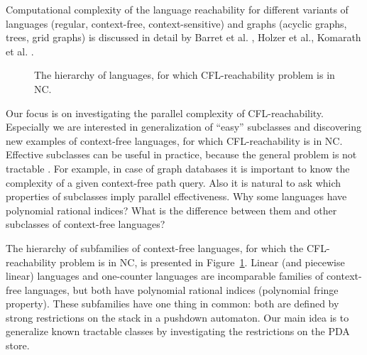 \documentclass{ws-ijfcs}
\begin{document}
Computational complexity of the language reachability for different variants of languages (regular, context-free, context-sensitive) and graphs (acyclic graphs, trees, grid graphs) is discussed in detail by Barret et al. \cite{Barrett}, Holzer et al.\cite{labelledGraphs}, Komarath et al. \cite{LReach}. 


\begin{figure}
\centering
{}
\caption{The hierarchy of languages, for which CFL-reachability problem is in NC.}
\label{hierarchy}      
\end{figure}
Our focus is on investigating the parallel complexity of CFL-reachability. Especially we are interested in generalization of ``easy'' subclasses and discovering new examples of context-free languages, for which CFL-reachability is in NC. Effective subclasses can be useful in practice, because the general problem is not tractable \cite{ExperimentalCFPQ}. For example, in case of graph databases it is important to know the complexity of a given context-free path query. Also it is natural to ask which properties of subclasses imply parallel effectiveness. Why some languages have polynomial rational indices? What is the difference between them and other subclasses of context-free languages?


The hierarchy of subfamilies of context-free languages, for which the CFL-reachability problem is in NC, is presented in Figure~\ref{hierarchy}. Linear (and piecewise linear) languages and one-counter languages are incomparable families of context-free languages, but both have polynomial rational indices (polynomial fringe property). These subfamilies have one thing in common: both are defined by strong restrictions on the stack in a pushdown automaton. Our main idea is to generalize known tractable classes by investigating the restrictions on the PDA store.
\end{document}
